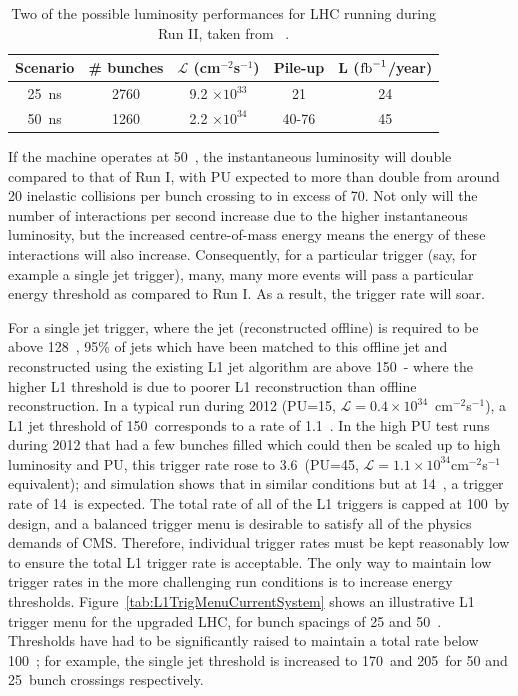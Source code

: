 \begin{table}[h]
\begin{tabular}{c|c|c|c|c}
Scenario & \# bunches & $\mathcal{L}$ (cm$^{-2}$s$^{-1}$) & Pile-up & L ($\mathrm{fb}^{-1}$/year) \\ \hline
25~ns & 2760 & 9.2 $\times 10^{33}$ & 21 & 24 \\ 
50~ns & 1260 & 2.2 $\times 10^{34}$ & 40-76 & 45 \\ \hline
\end{tabular}
\caption{\label{lumiProgramme}Two of the possible luminosity performances for \ac{LHC} running during Run II, taken from ~\cite{Tapper:1556311}.}
\end{table}


If the machine operates at 50~\ns, the instantaneous luminosity will double compared to that of Run I, with PU expected to more than double from around 20 inelastic collisions per bunch crossing to in excess of 70.
Not only will the number of interactions per second increase due to the higher instantaneous luminosity, but the increased centre-of-mass energy means the energy of these interactions will also increase. 
Consequently, for a particular trigger (say, for example a single jet trigger), many, many more events will pass a particular energy threshold as compared to Run I. 
As a result, the trigger rate will soar.

For a single jet trigger, where the jet (reconstructed offline) is required to be above 128~\GeV, 95\% of jets which have been matched to this offline jet and reconstructed using the existing \ac{L1} jet algorithm are above 150~\GeV - where the higher \ac{L1} threshold is due to poorer \ac{L1} reconstruction than offline reconstruction. 
In a typical run during 2012 (PU=15, $\mathcal{L}=0.4 \times 10^{34}$~cm$^{-2}$s$^{-1}$), a \ac{L1} jet threshold of 150~\GeV corresponds to a rate of 1.1~\kHz.
In the high \ac{PU} test runs during 2012 that had a few bunches filled which could then be scaled up to high luminosity and \ac{PU}, this trigger rate rose to 3.6~\kHz (PU=45, $\mathcal{L}=1.1 \times 10^{34}$cm$^{-2}$s$^{-1}$ equivalent); and simulation shows that in similar conditions but at 14~\TeV, a trigger rate of 14~\kHz is expected.
The total rate of all of the \ac{L1} triggers is capped at 100~\kHz by design, 
and a balanced trigger menu is desirable to satisfy all of the physics demands of \ac{CMS}.
Therefore, individual trigger rates must be kept reasonably low to ensure the total \ac{L1} trigger rate is acceptable.  
The only way to maintain low trigger rates in the more challenging run conditions is to increase energy thresholds.
Figure~\ref{tab:L1TrigMenuCurrentSystem} shows an illustrative \ac{L1} trigger menu for the upgraded \ac{LHC}, for bunch spacings of 25 and 50~\ns. 
Thresholds have had to be significantly raised to maintain a total rate below 100~\kHz; for example, the single jet threshold is increased to 170~\GeV and 205~\GeV for 50 and 25~\ns bunch crossings respectively.


